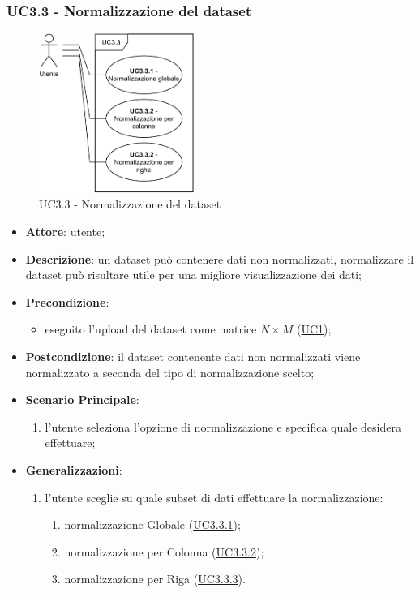     \subsubsection{UC3.3 - Normalizzazione del dataset}
    \label{uc3.3}
    \begin{figure}[htbp]
        \centering
        \includegraphics[width=0.45\textwidth]{source/sections/casi-uso/diagrams/uc3_3.pdf}
        \caption{UC3.3 - Normalizzazione del dataset}
        \label{fig:uc3.3}
    \end{figure}
    \begin{itemize}
    \item \textbf{Attore}: utente;
    \item \textbf{Descrizione}: un dataset può contenere dati non normalizzati, normalizzare il dataset può risultare utile per una migliore visualizzazione dei dati;
    \item \textbf{Precondizione}: 
    \begin{itemize}
        \item eseguito l'upload del dataset come matrice $N\times M$ (\hyperref[uc1]{UC1});
    \end{itemize}  
    \item \textbf{Postcondizione}: il dataset contenente dati non normalizzati viene normalizzato a seconda del tipo di normalizzazione scelto;
    \item \textbf{Scenario Principale}:
    \begin{enumerate}
        \item l'utente seleziona l'opzione di normalizzazione e specifica quale desidera effettuare;
    \end{enumerate}  
    \item \textbf{Generalizzazioni}: 
     \begin{enumerate}
            \item l'utente sceglie su quale subset di dati effettuare la normalizzazione:
                \begin{enumerate}
                    \item normalizzazione Globale (\hyperref[uc3.3.1]{UC3.3.1});
                    \item normalizzazione per Colonna (\hyperref[uc3.3.2]{UC3.3.2});
                    \item normalizzazione per Riga (\hyperref[uc3.3.3]{UC3.3.3}).
                \end{enumerate}
        \end{enumerate}  
    \end{itemize}
    
